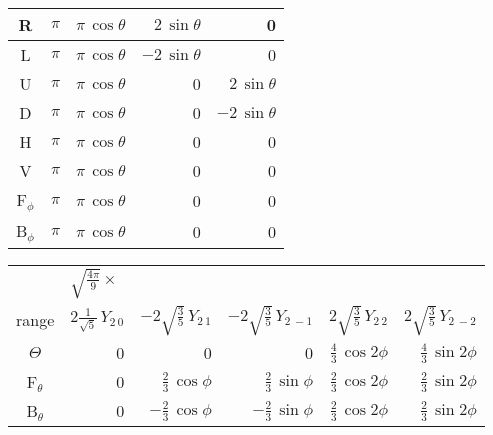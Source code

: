 \begin{table}[p]
\begin{tabular}{| c || r | r | r | r |}
    R  &  $\pi$
       &  $\pi\, \cos\theta$  &  $2\, \sin\theta$  &  0  \\
    \hline

    L  &  $\pi$
       &  $\pi\, \cos\theta$  &  $-2\, \sin\theta$  &  0  \\
    \hline

    U  &  $\pi$
       &  $\pi\, \cos\theta$  &  0  &  $2\, \sin\theta$  \\
    \hline

    D  &  $\pi$
       &  $\pi\, \cos\theta$  &  0  &  $-2\, \sin\theta$  \\
    \hline

    H  &  $\pi$
       &  $\pi\, \cos\theta$  &  0  &  0  \\
    \hline

    V  &  $\pi$
       &  $\pi\, \cos\theta$  &  0  &  0  \\
    \hline

    F$_\phi$  &  $\pi$
              &  $\pi\, \cos\theta$  &  0  &  0  \\
    \hline

    B$_\phi$  &  $\pi$
              &  $\pi\, \cos\theta$  &  0  &  0  \\
    \hline
  \end{tabular}

  \vspace{10pt}

  \begin{tabular}{| c || r | r | r | r | r |}
    \hline
    &  \multicolumn{5}{l|}{$\sqrt{\frac{4\pi}{9}}\times$}  \\
    range  &  $2\frac{1}{\sqrt{5}}\,Y_{2\:0}$
           &  $-2\sqrt{\frac{3}{5}}\,Y_{2\:1}$
           &  $-2\sqrt{\frac{3}{5}}\,Y_{2\:-1}$
           &  $2\sqrt{\frac{3}{5}}\,Y_{2\:2}$
           &  $2\sqrt{\frac{3}{5}}\,Y_{2\:-2}$  \\
    \hline\hline

    $\Theta$  &  0
              &  0  &  0
              &  $\frac{4}{3}\, \cos2\phi$  &  $\frac{4}{3}\, \sin2\phi$  \\
    \hline

    F$_\theta$  &  0
                &  $\frac{2}{3}\, \cos\phi$  &  $\frac{2}{3}\, \sin\phi$
                &  $\frac{2}{3}\, \cos2\phi$  &  $\frac{2}{3}\, \sin2\phi$  \\
    \hline

    B$_\theta$  &  0
                &  $-\frac{2}{3}\, \cos\phi$  &  $-\frac{2}{3}\, \sin\phi$
                &  $\frac{2}{3}\, \cos2\phi$  &  $\frac{2}{3}\, \sin2\phi$  \\
    \hline\hline


\end{tabular}
\end{table}
